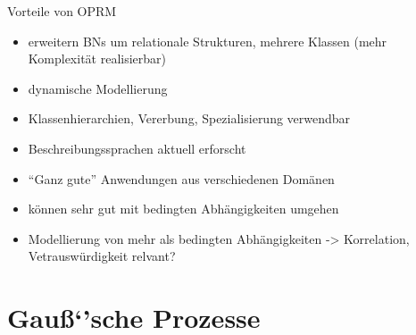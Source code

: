 \documentclass[paper=a4, fontsize=11pt]{scrartcl} %
\numberwithin{equation}{section} %
\numberwithin{figure}{section} %
\numberwithin{table}{section} %
\begin{document}
Vorteile von OPRM
\begin{itemize}
\item erweitern BNs um relationale Strukturen, mehrere Klassen (mehr Komplexität realisierbar)
\item dynamische Modellierung
\item Klassenhierarchien, Vererbung, Spezialisierung verwendbar
\item Beschreibungssprachen aktuell erforscht
\item ``Ganz gute'' Anwendungen aus verschiedenen Domänen
\item können sehr gut mit bedingten Abhängigkeiten umgehen
\item Modellierung von mehr als bedingten Abhängigkeiten -> Korrelation, Vetrauswürdigkeit relvant?
\end{itemize}

\section{Gauß`'sche Prozesse}
\end{document}
